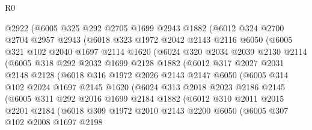 \begin{lexlean}{R0}
\begin{coremodule}
        @2922
        (@6005
          @325
          @292
          @2705
          @1699
          @2943
          @1882
          (@6012
            @324
            @2700
            @2704
            @2957
            @2943
            (@6018
              @323
              @1972
              @2042
              @2143
              @2116
              @6050
              (@6005
                @321
                @102
                @2040
                @1697
                @2114
                @1620
                (@6024
                  @320
                  @2034
                  @2039
                  @2130
                  @2114
                  (@6005
                    @318
                    @292
                    @2032
                    @1699
                    @2128
                    @1882
                    (@6012
                      @317
                      @2027
                      @2031
                      @2148
                      @2128
                      (@6018
                        @316
                        @1972
                        @2026
                        @2143
                        @2147
                        @6050
                        (@6005
                          @314
                          @102
                          @2024
                          @1697
                          @2145
                          @1620
                          (@6024
                            @313
                            @2018
                            @2023
                            @2186
                            @2145
                            (@6005
                              @311
                              @292
                              @2016
                              @1699
                              @2184
                              @1882
                              (@6012
                                @310
                                @2011
                                @2015
                                @2201
                                @2184
                                (@6018
                                  @309
                                  @1972
                                  @2010
                                  @2143
                                  @2200
                                  @6050
                                  (@6005
                                    @307
                                    @102
                                    @2008
                                    @1697
                                    @2198

\end{coremodule}
\end{lexlean}
